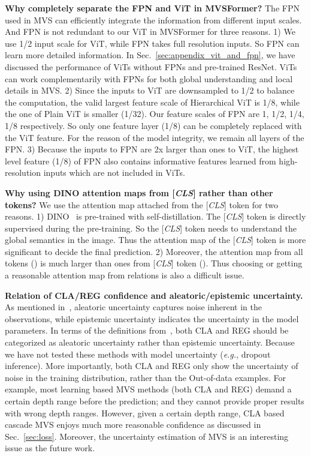\documentclass[10pt]{article} \usepackage[preprint]{tmlr}
\begin{document}
\noindent\textbf{Why completely separate the FPN and ViT in MVSFormer?}
The FPN used in MVS can efficiently integrate the information from different input scales. And FPN is not redundant to our ViT in MVSFormer for three reasons.
1) We use 1/2 input scale for ViT, while FPN takes full resolution inputs. So FPN can learn more detailed information. In Sec.~\ref{sec:appendix_vit_and_fpn}, we have discussed the performance of ViTs without FPNs and pre-trained ResNet. ViTs can work complementarily with FPNs for both global understanding and local details in MVS.
2) Since the inputs to ViT are downsampled to 1/2 to balance the computation, the valid largest feature scale of Hierarchical ViT is 1/8, while the one of Plain ViT is smaller (1/32). Our feature scales of FPN are 1, 1/2, 1/4, 1/8 respectively. So only one feature layer (1/8) can be completely replaced with the ViT feature. For the reason of the model integrity, we remain all layers of the FPN.
3) Because the inputs to FPN are 2x larger than ones to ViT, the highest level feature (1/8) of FPN also contains informative features learned from high-resolution inputs which are not included in ViTs.


\noindent\textbf{Why using DINO attention maps from [\emph{CLS}] rather than other tokens?}
We use the attention map attached from the [\emph{CLS}] token for two reasons. 
1) DINO~\citep{caron2021emerging} is pre-trained with self-distillation. The [\emph{CLS}] token is directly supervised during the pre-training. So the [\emph{CLS}] token needs to understand the global semantics in the image. Thus the attention map of the [\emph{CLS}] token is more significant to decide the final prediction. 
2) Moreover, the attention map from all tokens () is much larger than ones from [\emph{CLS}] token (). Thus choosing or getting a reasonable attention map from  relations is also a difficult issue.

\noindent\textbf{Relation of CLA/REG confidence and aleatoric/epistemic uncertainty.}
As mentioned in~\citet{kendall2017uncertainties}, aleatoric uncertainty captures noise inherent in the observations, while epistemic uncertainty indicates the uncertainty in the model parameters.
In terms of the definitions from~\citet{kendall2017uncertainties}, both CLA and REG should be categorized as aleatoric uncertainty rather than epistemic uncertainty. Because we have not tested these methods with model uncertainty (\emph{e.g.}, dropout inference). More importantly, both CLA and REG only show the uncertainty of noise in the training distribution, rather than the Out-of-data examples. For example, most learning based MVS methods (both CLA and REG) demand a certain depth range before the prediction; and they cannot provide proper results with wrong depth ranges. However, given a certain depth range, CLA based cascade MVS enjoys much more reasonable confidence as discussed in Sec.~\ref{sec:loss}. Moreover, the uncertainty estimation of MVS is an interesting issue as the future work.
\end{document}
